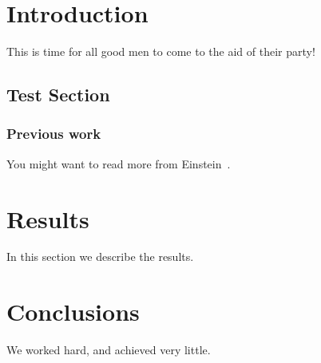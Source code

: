 \documentclass[a4paper, 11pt, oneside]{article/HSR}  %
\begin{document}
\begin{multicols}{2}








  \section{Introduction}
  This is time for all good men to come to the aid of their party!

  \subsection{Test Section}\label{test section}
  \Blindtext
  \Blindtext
  \Blindtext

  \subsubsection{Previous work}\label{previous work}
  You might want to read more from Einstein~\cite{Einstein}.

  \section{Results}\label{results}
  In this section we describe the results.
  \Blindtext

  \section{Conclusions}\label{conclusions}
  We worked hard, and achieved very little.
  \Blindtext




\end{multicols}
\end{document}
